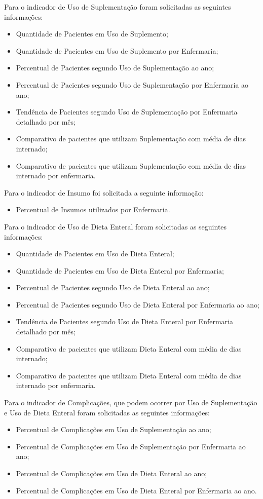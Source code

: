 Para o indicador de Uso de Suplementação foram solicitadas as seguintes informações:
\begin{itemize}
    \item Quantidade de Pacientes em Uso de Suplemento;
    \item Quantidade de Pacientes em Uso de Suplemento por Enfermaria;
    \item Percentual de Pacientes segundo Uso de Suplementação ao ano;
    \item Percentual de Pacientes segundo Uso de Suplementação por Enfermaria ao ano;
    \item Tendência de Pacientes segundo Uso de Suplementação por Enfermaria detalhado por mês;
    \item Comparativo de pacientes que utilizam Suplementação com média de dias internado;
    \item Comparativo de pacientes que utilizam Suplementação com média de dias internado por enfermaria.
\end{itemize}

Para o indicador de Insumo foi solicitada a seguinte informação:
\begin{itemize}
    \item Percentual de Insumos utilizados por Enfermaria.
\end{itemize}

Para o indicador de Uso de Dieta Enteral foram solicitadas as seguintes informações:
\begin{itemize}
    \item Quantidade de Pacientes em Uso de Dieta Enteral;
    \item Quantidade de Pacientes em Uso de Dieta Enteral por Enfermaria;
    \item Percentual de Pacientes segundo Uso de Dieta Enteral ao ano;
    \item Percentual de Pacientes segundo Uso de Dieta Enteral por Enfermaria ao ano;
    \item Tendência de Pacientes segundo Uso de Dieta Enteral por Enfermaria detalhado por mês;
    \item Comparativo de pacientes que utilizam Dieta Enteral com média de dias internado;
    \item Comparativo de pacientes que utilizam Dieta Enteral com média de dias internado por enfermaria.
\end{itemize}

Para o indicador de Complicações, que podem ocorrer por Uso de Suplementação e Uso de Dieta Enteral foram solicitadas as seguintes informações:
\begin{itemize}
    \item Percentual de Complicações em Uso de Suplementação ao ano;
    \item Percentual de Complicações em Uso de Suplementação por Enfermaria ao ano;
    \item Percentual de Complicações em Uso de Dieta Enteral ao ano;
    \item Percentual de Complicações em Uso de Dieta Enteral por Enfermaria ao ano.
\end{itemize}

